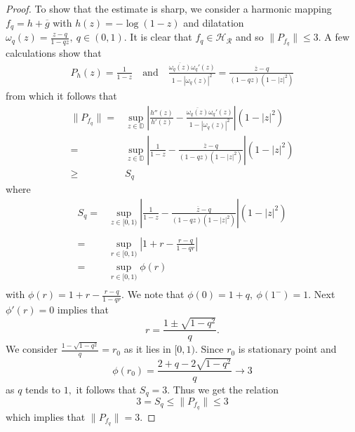 \documentclass[10pt,a4paper]{amsart}
\begin{document}
\begin{proof}
		
		To show that the estimate is sharp, we consider a harmonic mapping $f_q=h+\overline{g}$ with $h(z)=-\log{(1-z)}$ and dilatation $\omega_q(z)=\frac{z-q}{1-qz},~q\in(0,1).$ It is clear that $f_q\in \mathcal{H_R}$ and so $\|P_{f_q}\|\le3.$ A few calculations show that 
		\begin{align}
			P_h(z)=\frac{1}{1-z}\quad\text{and}\quad \frac{\overline{\omega_q(z)}\omega_q'(z)}{1-|\omega_q(z)|^2}=\frac{\overline{z}-q}{(1-qz)(1-|z|^2)}
		\end{align}
		from which it follows that 
		\begin{align}
			\|P_{f_q}\|=&\sup_{z \in \mathbb{D}}\left|\frac{h''(z)}{h'(z)}-\frac{\overline{\omega_q(z)}\omega_q'(z)}{1-|\omega_q(z)|^2}\right|(1-|z|^2)\\\nonumber
			=&\sup_{z \in \mathbb{D}}\left|\frac{1}{1-z}-\frac{\overline{z}-q}{(1-qz)(1-|z|^2)}\right|(1-|z|^2)\\\nonumber
			\ge & S_q
		\end{align}
		where 
		\begin{align}
			S_q=&\sup_{z \in [0,1)}\left|\frac{1}{1-z}-\frac{\overline{z}-q}{(1-qz)(1-|z|^2)}\right|(1-|z|^2)\\\nonumber\\\nonumber
			=&\sup_{r \in [0,1)}\left|1+r-\frac{r-q}{1-qr}\right|\\\nonumber
			=&\sup_{r \in [0,1)}\phi(r)\\\nonumber
		\end{align}
		with $\phi(r)=1+r-\frac{r-q}{1-qr}.$ We note that $\phi(0)=1+q,~\phi(1^-)=1.$ Next $\phi'(r)=0$ implies that $$r=\frac{1\pm\sqrt{1-q^2}}{q}.$$ We consider $\frac{1-\sqrt{1-q^2}}{q}=r_0$ as it lies in $[0,1).$ Since $r_0$ is stationary point and $$\phi(r_0)=\frac{2+q-2\sqrt{1-q^2}}{q}\rightarrow 3$$ as $q$ tends to $1,$ it follows that $S_q=3.$ Thus we get the relation $$3=S_q\le \|P_{f_q}\|\le 3$$ which implies that $\|P_{f_q}\|=3.$
	\end{proof}
\end{document}
